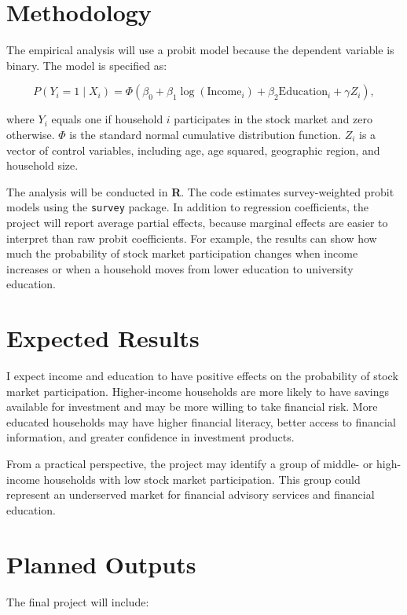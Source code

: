 \documentclass[12pt]{article}
\begin{document}
\section{Methodology}

The empirical analysis will use a probit model because the dependent variable is binary. The model is specified as:

\[
P(Y_i = 1 \mid X_i) =
\Phi(\beta_0 + \beta_1 \log(\text{Income}_i)
+ \beta_2 \text{Education}_i + \gamma Z_i),
\]

where \(Y_i\) equals one if household \(i\) participates in the stock market and zero otherwise. \(\Phi\) is the standard normal cumulative distribution function. \(Z_i\) is a vector of control variables, including age, age squared, geographic region, and household size.

The analysis will be conducted in \textbf{R}. The code estimates survey-weighted probit models using the \texttt{survey} package. In addition to regression coefficients, the project will report average partial effects, because marginal effects are easier to interpret than raw probit coefficients. For example, the results can show how much the probability of stock market participation changes when income increases or when a household moves from lower education to university education.

\section{Expected Results}

I expect income and education to have positive effects on the probability of stock market participation. Higher-income households are more likely to have savings available for investment and may be more willing to take financial risk. More educated households may have higher financial literacy, better access to financial information, and greater confidence in investment products.

From a practical perspective, the project may identify a group of middle- or high-income households with low stock market participation. This group could represent an underserved market for financial advisory services and financial education.

\section{Planned Outputs}

The final project will include:
\end{document}
